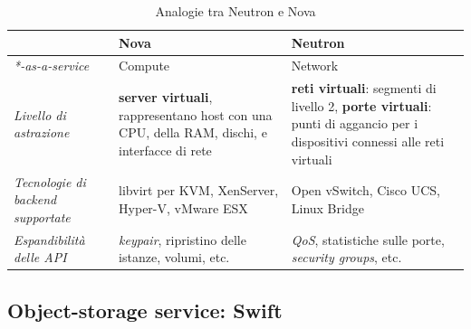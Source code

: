 \begin{table}[h]
\centering
\begin{tabular}{| m{3cm}| m{5cm} | m{5cm} | }
\hline
& \textbf{Nova} & \textbf{Neutron} \\ \hline
\textit{*-as-a-service} & Compute & Network \\ \hline
\textit{Livello di astrazione} & \textbf{server virtuali}, rappresentano host con una CPU, della RAM, dischi, e interfacce di rete & \textbf{reti virtuali}: segmenti di livello 2, \textbf{porte virtuali}: punti di aggancio per i dispositivi connessi alle reti virtuali \\ \hline
\textit{Tecnologie di backend supportate} & libvirt per KVM, XenServer, Hyper-V, vMware ESX & Open vSwitch, Cisco UCS, Linux Bridge \\ \hline
\textit{Espandibilità delle API} & \textit{keypair}, ripristino delle istanze, volumi, etc. & \textit{QoS}, statistiche sulle porte, \textit{security groups}, etc. \\ \hline

\end{tabular}
\caption{Analogie tra Neutron e Nova}
\label{tab:AnalogiesNeutronNova}
\end{table}
\begin{figure}[H]
\centering
{}
\caption{\cite{NeutronNova}}\label{NeutronNova}
\end{figure}

\subsection{Object-storage service: Swift}

